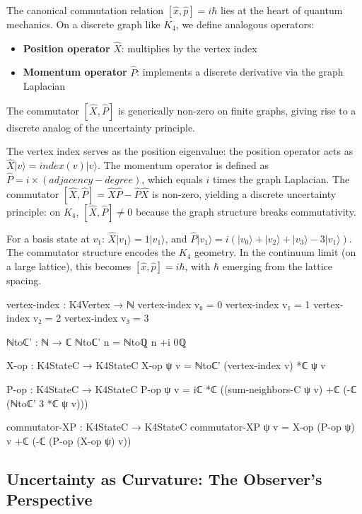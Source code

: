 \documentclass[11pt,a4paper]{book}
\def\text#1{#1}%
\begin{document}
The canonical commutation relation $[\hat{x},\hat{p}] = i\hbar$ lies at the heart of 
quantum mechanics. On a discrete graph like $K_4$, we define analogous operators:
\begin{itemize}
  \item \textbf{Position operator} $\hat{X}$: multiplies by the vertex index
  \item \textbf{Momentum operator} $\hat{P}$: implements a discrete derivative via the graph Laplacian
\end{itemize}

The commutator $[\hat{X}, \hat{P}]$ is generically non-zero on finite graphs,
giving rise to a discrete analog of the uncertainty principle.

The vertex index serves as the position eigenvalue: the position operator acts as $\hat{X}|v\rangle = \text{index}(v)|v\rangle$. The momentum operator is defined as $\hat{P} = i \times (\text{adjacency} - \text{degree})$, which equals $i$ times the graph Laplacian. The commutator $[\hat{X},\hat{P}] = \hat{X}\hat{P} - \hat{P}\hat{X}$ is non-zero, yielding a discrete uncertainty principle: on $K_4$, $[\hat{X},\hat{P}] \neq 0$ because the graph structure breaks commutativity.

For a basis state at $v_1$: $\hat{X}|v_1\rangle = 1|v_1\rangle$, and $\hat{P}|v_1\rangle = i(|v_0\rangle + |v_2\rangle + |v_3\rangle - 3|v_1\rangle)$. The commutator structure encodes the $K_4$ geometry. In the continuum limit (on a large lattice), this becomes $[\hat{x},\hat{p}] = i\hbar$, with $\hbar$ emerging from the lattice spacing.

\begin{code}
vertex-index : K4Vertex → ℕ
vertex-index v₀ = 0
vertex-index v₁ = 1
vertex-index v₂ = 2
vertex-index v₃ = 3

ℕtoℂ' : ℕ → ℂ
ℕtoℂ' n = ℕtoℚ n +i 0ℚ

X-op : K4StateC → K4StateC
X-op ψ v = ℕtoℂ' (vertex-index v) *ℂ ψ v

P-op : K4StateC → K4StateC
P-op ψ v = iℂ *ℂ ((sum-neighbors-C ψ v) +ℂ (-ℂ (ℕtoℂ' 3 *ℂ ψ v)))

commutator-XP : K4StateC → K4StateC
commutator-XP ψ v = X-op (P-op ψ) v +ℂ (-ℂ (P-op (X-op ψ) v))
\end{code}

\subsection{Uncertainty as Curvature: The Observer's Perspective}
\end{document}
